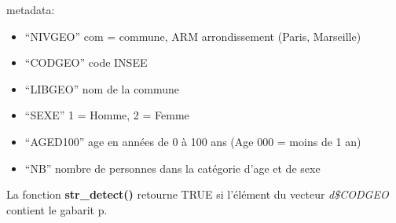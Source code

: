 \documentclass[]{article}
\begin{document}
metadata:

\begin{itemize}
\itemsep1pt\parskip0pt
\item
  ``NIVGEO'' com = commune, ARM arrondissement (Paris, Marseille)
\item
  ``CODGEO'' code INSEE
\item
  ``LIBGEO'' nom de la commune
\item
  ``SEXE'' 1 = Homme, 2 = Femme
\item
  ``AGED100'' age en années de 0 à 100 ans (Age 000 = moins de 1 an)
\item
  ``NB'' nombre de personnes dans la catégorie d'age et de sexe
\end{itemize}

La fonction \textbf{str\_detect()} retourne TRUE si l'élément du vecteur
\emph{d\$CODGEO} contient le gabarit p.
\end{document}
